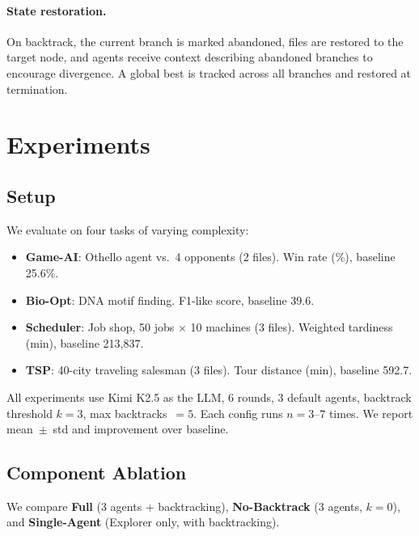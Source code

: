 \documentclass{article}
\begin{document}
\paragraph{State restoration.} On backtrack, the current branch is marked abandoned, files are restored to the target node, and agents receive context describing abandoned branches to encourage divergence. A global best is tracked across all branches and restored at termination.

\section{Experiments}
\label{sec:experiments}

\subsection{Setup}

We evaluate on four tasks of varying complexity:
\begin{itemize}[nosep,leftmargin=1.2em]
\item \textbf{Game-AI}: Othello agent vs.\ 4 opponents (2 files). Win rate (\%), baseline 25.6\%.
\item \textbf{Bio-Opt}: DNA motif finding. F1-like score, baseline 39.6.
\item \textbf{Scheduler}: Job shop, 50 jobs $\times$ 10 machines (3 files). Weighted tardiness (min), baseline 213{,}837.
\item \textbf{TSP}: 40-city traveling salesman (3 files). Tour distance (min), baseline 592.7.
\end{itemize}

All experiments use Kimi K2.5 as the LLM, 6 rounds, 3 default agents, backtrack threshold $k{=}3$, max backtracks~$=5$. Each config runs $n{=}3$--$7$ times. We report mean~$\pm$~std and improvement over baseline.

\subsection{Component Ablation}

We compare \textbf{Full} (3 agents + backtracking), \textbf{No-Backtrack} (3 agents, $k{=}0$), and \textbf{Single-Agent} (Explorer only, with backtracking).
\end{document}
